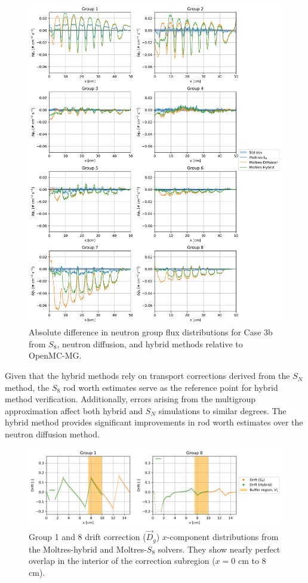 \documentclass[letterpaper]{mc2025}
\begin{document}
\begin{figure}[p]
  \centering
  \includegraphics[width=0.98\columnwidth]{case-3b-flux-diff}
  \caption{Absolute difference in neutron group flux distributions for Case 3b from $S_8$,
  neutron diffusion, and hybrid methods relative to OpenMC-MG.}
  \label{fig:3b-flux-diff}
\end{figure}

Given that the hybrid methods rely on transport corrections derived from the $S_N$ method, the
$S_8$ rod worth estimates serve as the
reference point for hybrid method verification. Additionally, errors arising from the multigroup
approximation affect both hybrid and $S_N$ simulations to similar degrees. The hybrid method
provides significant improvements in rod worth estimates over the neutron diffusion method.
%
\begin{figure}[t]
  \centering
  \includegraphics[width=\columnwidth]{case-3b-drift}
  \caption{Group 1 and 8 drift correction ($\vec{D}_g$) $x$-component distributions from the
  Moltres-hybrid and Moltres-$S_8$ solvers. They show nearly perfect overlap in the interior of the
  correction subregion ($x=0$ cm to $8$ cm).}
  \label{fig:3b-drift}
\end{figure}
\end{document}
